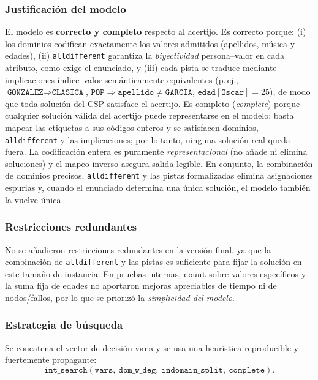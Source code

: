 \subsubsection*{Justificación del modelo}
El modelo es \textbf{correcto y completo} respecto al acertijo. Es correcto porque: (i) los dominios codifican exactamente los valores admitidos (apellidos, música y edades), (ii) \texttt{alldifferent} garantiza la \emph{biyectividad} persona–valor en cada atributo, como exige el enunciado, y (iii) cada pista se traduce mediante implicaciones índice–valor semánticamente equivalentes (p.\,ej., \(\texttt{GONZALEZ}\Rightarrow\texttt{CLASICA}\), \(\texttt{POP}\Rightarrow\texttt{apellido}\neq\texttt{GARCIA}\), \(\texttt{edad}[\texttt{Oscar}]=25\)), de modo que toda solución del CSP satisface el acertijo. Es completo (\emph{complete}) porque cualquier solución válida del acertijo puede representarse en el modelo: basta mapear las etiquetas a sus códigos enteros y se satisfacen dominios, \texttt{alldifferent} y las implicaciones; por lo tanto, ninguna solución real queda fuera. La codificación entera es puramente \emph{representacional} (no añade ni elimina soluciones) y el mapeo inverso asegura salida legible. En conjunto, la combinación de dominios precisos, \texttt{alldifferent} y las pistas formalizadas elimina asignaciones espurias y, cuando el enunciado determina una única solución, el modelo también la vuelve única.

\subsubsection*{Restricciones redundantes}
No se añadieron restricciones redundantes en la versión final, ya que la combinación de \texttt{alldifferent} y las pistas es suficiente para fijar la solución en este tamaño de instancia. En pruebas internas, \(\texttt{count}\) sobre valores específicos y la suma fija de edades no aportaron mejoras apreciables de tiempo ni de nodos/fallos, por lo que se priorizó la \emph{simplicidad del modelo}.

\subsubsection*{Estrategia de búsqueda}
Se concatena el vector de decisión \(\texttt{vars}\) y se usa una heurística reproducible y fuertemente propagante:
\[
\texttt{int\_search}(\texttt{vars},\ \texttt{dom\_w\_deg},\ \texttt{indomain\_split},\ \texttt{complete}).
\]
